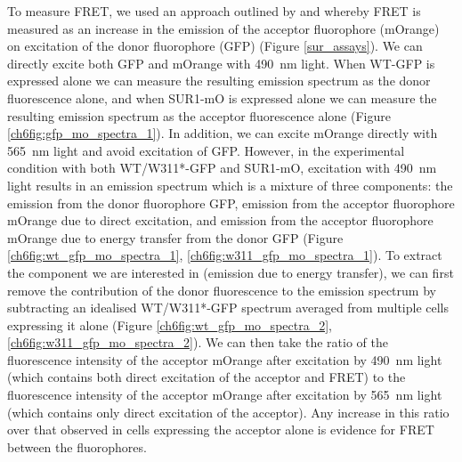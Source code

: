 To measure FRET, we used an approach outlined by \citeauthor{clegg_18_1992} and \citeauthor{selvin_13_1995} whereby FRET is measured as an increase in the emission of the acceptor fluorophore (mOrange) on excitation of the donor fluorophore (GFP) (Figure \ref{sur_assays}).
We can directly excite both GFP and mOrange with \SI{490}{\nano\metre} light.
When WT-GFP is expressed alone we can measure the resulting emission spectrum as the donor fluorescence alone, and when SUR1-mO is expressed alone we can measure the resulting emission spectrum as the acceptor fluorescence alone (Figure \ref{ch6fig:gfp_mo_spectra_1}).
In addition, we can excite mOrange directly with \SI{565}{\nano\metre} light and avoid excitation of GFP.
However, in the experimental condition with both WT/W311*-GFP and SUR1-mO, excitation with \SI{490}{\nano\metre} light results in an emission spectrum which is a mixture of three components: the emission from the donor fluorophore GFP, emission from the acceptor fluorophore mOrange due to direct excitation, and emission from the acceptor fluorophore mOrange due to energy transfer from the donor GFP (Figure \ref{ch6fig:wt_gfp_mo_spectra_1}, \ref{ch6fig:w311_gfp_mo_spectra_1}).
To extract the component we are interested in (emission due to energy transfer), we can first remove the contribution of the donor fluorescence to the emission spectrum by subtracting an idealised WT/W311*-GFP spectrum averaged from multiple cells expressing it alone (Figure \ref{ch6fig:wt_gfp_mo_spectra_2}, \ref{ch6fig:w311_gfp_mo_spectra_2}).
We can then take the ratio of the fluorescence intensity of the acceptor mOrange after excitation by \SI{490}{\nano\metre} light (which contains both direct excitation of the acceptor and FRET) to the fluorescence intensity of the acceptor mOrange after excitation by \SI{565}{\nano\metre} light (which contains only direct excitation of the acceptor).
Any increase in this ratio over that observed in cells expressing the acceptor alone is evidence for FRET between the fluorophores.

